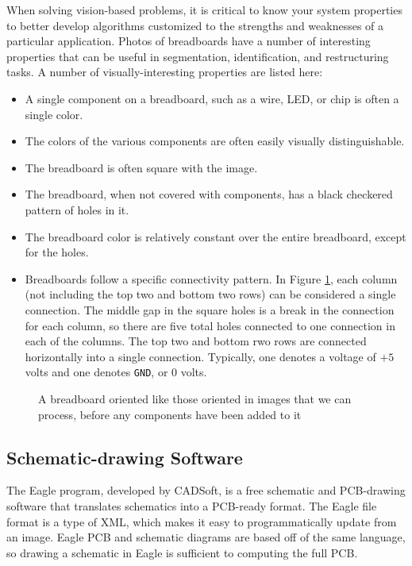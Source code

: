 \documentclass[10pt,twocolumn,letterpaper]{article}
\begin{document}
When solving vision-based problems, it is critical to know your system
properties to better develop algorithms customized to the strengths and
weaknesses of a particular application. Photos of breadboards have a number of
interesting properties that can be useful in segmentation, identification, and
restructuring tasks. A number of visually-interesting properties are listed here:
\begin{itemize}
\item A single component on a breadboard, such as a wire, LED, or chip is often a single color. 
\item The colors of the various components are often easily visually distinguishable. 
\item The breadboard is often square with the image. 
\item The breadboard, when not covered with components, has a black checkered pattern of holes in it. 
\item The breadboard color is relatively constant over the entire breadboard, except for the holes.
\item Breadboards follow a specific connectivity pattern. In Figure \ref{fig:board}, each column (not including the top two and bottom two rows) can be considered a single connection. The middle gap in the square holes is a break in the connection for each column, so there are five total holes connected to one connection in each of the columns. The top two and bottom rwo rows are connected horizontally into a single connection. Typically, one denotes a voltage of $+5$ volts and one denotes \verb|GND|, or $0$ volts. 
\end{itemize}

\begin{figure}[t]
\begin{center}
\end{center}
   \caption{A breadboard oriented like those oriented in images that
     we can process, before any components have been added to it}
\label{fig:board}
\end{figure}

\subsection{Schematic-drawing Software}

The Eagle program, developed by CADSoft, is a free schematic and PCB-drawing
software that translates schematics into a PCB-ready format. The Eagle file
format is a type of XML, which makes it easy to programmatically update from an
image. Eagle PCB and schematic diagrams are based off of the same language, so
drawing a schematic in Eagle is sufficient to computing the full PCB. 
\end{document}
